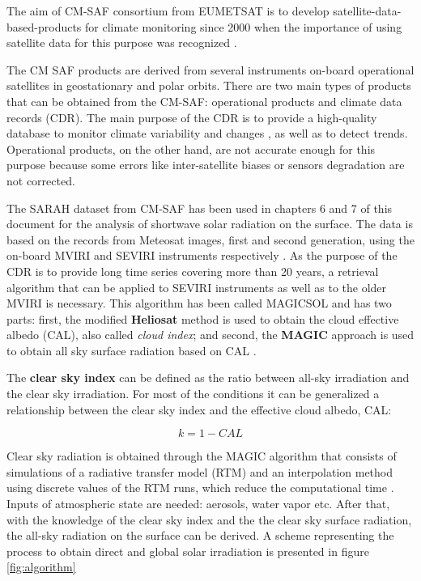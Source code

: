 The aim of CM-SAF consortium from EUMETSAT is to develop satellite-data-based-products for climate monitoring since 2000 when the importance of using satellite data for this purpose was recognized \cite*{schulz2009operational}.

The CM SAF products are derived from several instruments on-board operational satellites in geostationary and polar orbits. There are two main types of products that can be obtained from the CM-SAF: operational products and climate data records (CDR). The main purpose of the CDR is to provide a high-quality database to monitor climate variability and changes \cite*{Muller2015}, as well as to detect trends. Operational products, on the other hand, are not accurate enough for this purpose because some errors like inter-satellite biases or sensors degradation are not corrected.

The SARAH dataset from CM-SAF has been used in chapters 6 and 7 of this document for the analysis of shortwave solar radiation on the surface. The data is based on the records from Meteosat images, first and second generation, using the on-board MVIRI and SEVIRI instruments respectively \cite*{Posselt2012}. As the purpose of the CDR is to provide long time series covering more than 20 years, a retrieval algorithm that can be applied to SEVIRI instruments as well as to the older MVIRI is necessary. This algorithm has been called MAGICSOL and has two parts: first, the modified \textbf{Heliosat} method is used to obtain the cloud effective albedo (CAL), also called \textit{cloud index};  and second, the \textbf{MAGIC} approach is used to obtain all sky surface radiation based on CAL \cite*{Posselt2012}. %

The \textbf{clear sky index} can be defined as the ratio between all-sky irradiation and the clear sky irradiation. For most of the conditions it can be generalized a relationship between the clear sky index and the effective cloud albedo, CAL:

\begin{equation}
  k=1-CAL
\end{equation}

Clear sky radiation is obtained through the MAGIC algorithm \cite*{mueller2009} that consists of simulations of a radiative transfer model (RTM) and an interpolation method using discrete values of the RTM runs, which reduce the computational time \cite*{mueller2009}. Inputs of atmospheric state are needed: aerosols, water vapor etc. After that, with the knowledge of the clear sky index and the the clear sky surface radiation, the all-sky radiation on the surface can be derived. A scheme representing the process to obtain direct and global solar irradiation is presented in figure \ref{fig:algorithm}\\

